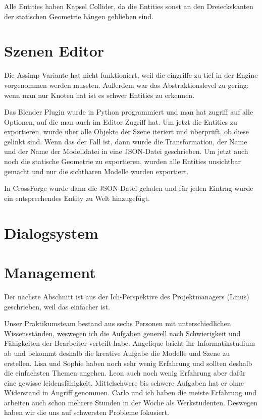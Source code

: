 Alle Entities haben Kapsel Collider, da die Entities sonst an den Dreieckskanten der statischen Geometrie hängen geblieben sind.

\section{Szenen Editor}

Die Assimp Variante hat nicht funktioniert, weil die eingriffe zu tief in der Engine vorgenommen werden mussten. Außerdem war das Abstraktionslevel zu gering: wenn man nur Knoten hat ist es schwer Entities zu erkennen.

Das Blender Plugin wurde in Python programmiert und man hat zugriff auf alle Optionen, auf die man auch im Editor Zugriff hat. Um jetzt die Entities zu exportieren, wurde über alle Objekte der Szene iteriert und überprüft, ob diese gelinkt sind. Wenn das der Fall ist, dann wurde die Transformation, der Name und der Name der Modelldatei in eine JSON-Datei geschrieben. Um jetzt auch noch die statische Geometrie zu exportieren, wurden alle Entities unsichtbar gemacht und nur die sichtbaren Modelle wurden exportiert.

In CrossForge wurde dann die JSON-Datei geladen und für jeden Eintrag wurde ein entsprechendes Entity zu Welt hinzugefügt.

\section{Dialogsystem}

\section{Management}

Der nächste Abschnitt ist aus der Ich-Perspektive des Projektmanagers (Linus) geschrieben, weil das einfacher ist.

Unser Praktikumsteam bestand aus sechs Personen mit unterschiedlichen Wissensständen, weswegen ich die Aufgaben generell nach Schwierigkeit und Fähigkeiten der Bearbeiter verteilt habe. Angelique bricht ihr Informatikstudium ab und bekommt deshalb die kreative Aufgabe die Modelle und Szene zu erstellen. Lisa und Sophie haben noch sehr wenig Erfahrung und sollten deshalb die einfachsten Themen angehen. Leon auch noch wenig Erfahrung aber dafür eine gewisse leidensfähigkeit. Mittelschwere bis schwere Aufgaben hat er ohne Widerstand in Angriff genommen. Carlo und ich haben die meiste Erfahrung und arbeiten auch schon mehrere Stunden in der Woche als Werkstudenten. Deswegen haben wir die uns auf schwersten Probleme fokusiert.

